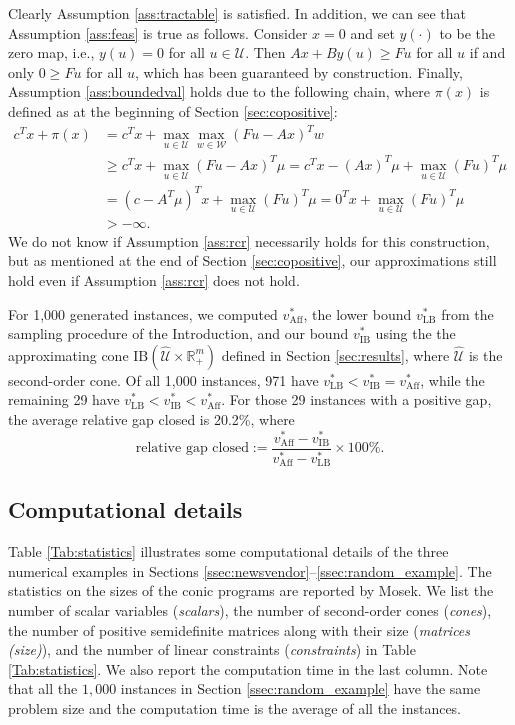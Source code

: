 \documentclass[12pt]{article}
\DeclareMathOperator{\AP}{Aff}
\DeclareMathOperator{\LB}{LB}
\newcommand{\U}{{\mathcal{U}}}
\newcommand{\W}{{\mathcal{W}}}
\newcommand{\K}{\widehat{\mathcal{U}}}
\newcommand{\IB}{\mathrm{IB}}
\newcommand{\p}{\pi}
\def\RR{{\mathbb{R}}}
\newcommand{\Q}{{\K \times \RR^m_+}}
\begin{document}
\begin{onehalfspace}
Clearly Assumption \ref{ass:tractable} is satisfied. In addition, we can
see that Assumption \ref{ass:feas} is true as follows. Consider $x = 0$
and set $y(\cdot)$ to be the zero map, i.e., $y(u) = 0$ for all $u \in
\U$. Then $Ax + B y(u) \ge Fu$ for all $u$ if and only $0 \ge Fu$ for
all $u$, which has been guaranteed by construction. Finally, Assumption
\ref{ass:boundedval} holds due to the following chain, where $\p(x)$ is
defined as at the beginning of Section \ref{sec:copositive}:
\begin{align*}
    c^T x + \p(x)
    &= c^T x + \max \limits_{u \in \U} \max \limits_{w \in \W} (Fu - Ax)^T w \\
    &\ge c^T x + \max \limits_{u \in \U} (Fu - Ax)^T \mu 
    = c^T x - (Ax)^T \mu + \max \limits_{u \in \U} (Fu)^T \mu \\
    &= (c - A^T \mu)^T x + \max \limits_{u \in \U} (Fu)^T \mu 
    = 0^T x + \max \limits_{u \in \U} (Fu)^T \mu \\
    &> -\infty.
\end{align*}
We do not know if Assumption \ref{ass:rcr} necessarily holds
for this construction, but as mentioned at the end of Section
\ref{sec:copositive}, our approximations still hold even if Assumption
\ref{ass:rcr} does not hold.

For 1,000 generated instances, we computed $v_{\AP}^*$, the lower bound
$v^*_{\text{LB}}$ from the sampling procedure of the Introduction, and
our bound $v_{\IB}^*$ using the the approximating cone $\IB(\Q)$ defined
in Section \ref{sec:results}, where $\K$ is the second-order cone. Of
all 1,000 instances, 971 have $v^*_{\text{LB}} < v_{\IB}^* = v_{\AP}^*$,
while the remaining 29 have $v^*_{\text{LB}} < v_{\IB}^* < v_{\AP}^*$.
For those 29 instances with a positive gap, the average relative gap
closed is 20.2\%, where
\[
\text{relative gap closed} :=
\frac{v_{\AP}^* - v_{\IB}^*}{v_{\AP}^* - v_{\LB}^*} \times 100\%.
\]

\subsection{Computational details}

Table \ref{Tab:statistics} illustrates some computational details of 
the three numerical examples in Sections \ref{ssec:newsvendor}--\ref{ssec:random_example}. 
The statistics on the sizes of the
conic programs are reported by Mosek. We list the number of scalar 
variables ({\em scalars\/}), the number of second-order cones
({\em cones\/}), the number of positive semidefinite matrices along 
with their size ({\em matrices (size)\/}), and the number of linear 
constraints ({\em constraints\/}) in Table \ref{Tab:statistics}. We also
report the computation time in the last column. Note that all the $1,000$
instances in Section \ref{ssec:random_example} have the same problem
size and the computation time is the average of all the instances. 


\end{onehalfspace}
\end{document}
